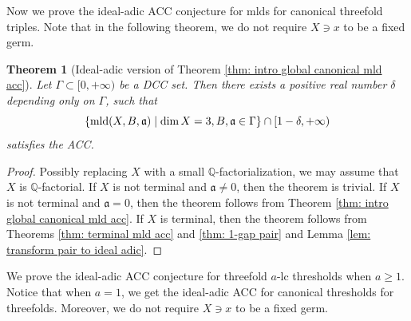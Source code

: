 \documentclass[11pt]{amsart}
\numberwithin{equation}{section}
\newcommand{\Qq}{\mathbb{Q}}
\newcommand{\aaa}{\mathfrak{a}}
\newcommand{\mld}{{\rm{mld}}}
\newcommand{\Ii}{{\Gamma}}
\newtheorem{thm}{Theorem}[section]
\theoremstyle{definition}
\theoremstyle{definition}
\begin{document}
Now we prove the ideal-adic ACC conjecture for mlds for canonical threefold triples. Note that in the following theorem, we do not require $X\ni x$ to be a fixed germ.

\begin{thm}[Ideal-adic version of Theorem {\ref{thm: intro global canonical mld acc}}]\label{thm: ideal-adic acc mld [1,3]}
Let $\Ii\subset [0,+\infty)$ be a DCC set. Then there exists a positive real number $\delta$ depending only on $\Ii$, such that
$$\{\mld(X,B,\aaa)\mid \dim X=3, B,\aaa\in\Ii\}\cap [1-\delta,+\infty)$$
satisfies the ACC.
\end{thm}
\begin{proof}
Possibly replacing $X$ with a small $\Qq$-factorialization, we may assume that $X$ is $\Qq$-factorial.  If $X$ is not terminal and $\aaa\not=\mathfrak{0}$, then the theorem is trivial. If $X$ is not terminal and $\aaa=\mathfrak{0}$, then the theorem follows from Theorem \ref{thm: intro global canonical mld acc}. If $X$ is terminal, then the theorem follows from Theorems \ref{thm:  terminal mld acc} and \ref{thm: 1-gap pair} and Lemma \ref{lem: transform pair to ideal adic}.
\end{proof}

We prove the ideal-adic ACC conjecture for threefold $a$-lc thresholds when $a\geq 1$. Notice that when $a=1$, we get the ideal-adic ACC for canonical thresholds for threefolds. Moreover, we do not require $X\ni x$ to be a fixed germ.
\end{document}
